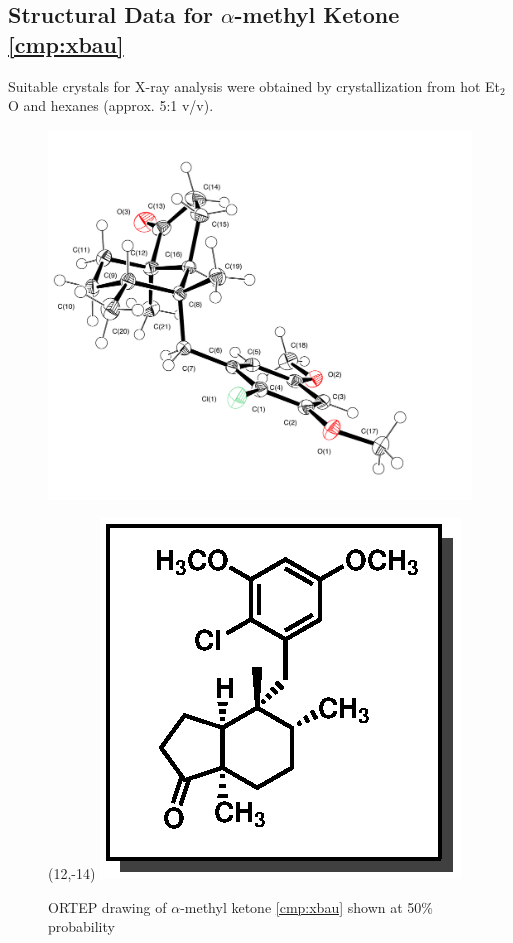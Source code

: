 \pagebreak

\subsection{Structural Data for $\alpha$-methyl Ketone \ref{cmp:xbau}}
Suitable crystals for X-ray analysis were obtained by
crystallization from hot Et$_2$O and hexanes (approx. 5:1 v/v).
\begin{figure}[h]
  \includegraphics[width=6in]{chp_singlecarbon/images/xray/xbau_labelled}
    \begin{textblock}{1}(12,-14)
\includegraphics[scale=0.8]{chp_singlecarbon/images/xbau}
\end{textblock}
  \caption{ORTEP drawing of  $\alpha$-methyl ketone \ref{cmp:xbau} shown at 50\% probability }
\end{figure}

